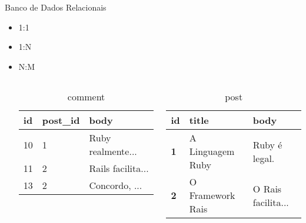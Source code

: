 \begin{frame}{Banco de Dados Relacionais}
\begin{itemize}
\begin{itemize}
			\item 1:1
			\item 1:N
			\item N:M
			\begin{columns}[t]
				\begin{table}[tp] 
					\scriptsize 
					\caption{comment}
					\setlength{\tabcolsep}{8pt}
					\setlength{\extrarowheight}{2pt}   			
					\begin{tabular}{|l|l|l|} 
						\hline
						\textbf{id} & \textbf{post\_id} & \textbf{body}\\
						\hline
						10 & 1 & Ruby realmente... \\
						\hline
						11 & 2 & Rails facilita... \\
						\hline
						13 & 2 & Concordo, ... \\
						\hline
					\end{tabular}
				\end{table}
				\begin{table}[tp] 
					\caption{post}
					\scriptsize 
					\setlength{\tabcolsep}{8pt}
					\setlength{\extrarowheight}{1pt}   			
					\begin{tabular}{|l|l|l|} 
						\hline
						\textbf{id} & \textbf{title} & \textbf{body} \\
						\hline
						\textbf{1} & A Linguagem Ruby & Ruby é legal. \\
						\hline
						\textbf{2} & O Framework Rais & O Rais facilita...\\
						\hline
					\end{tabular}
				\end{table}   		
			\end{columns}
		\end{itemize}  
	\end{itemize}
\end{frame}